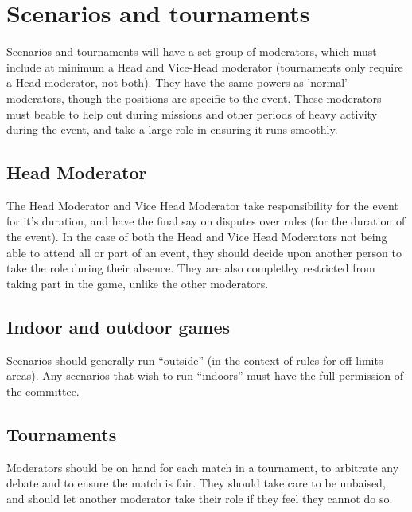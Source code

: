 \documentclass{article}
\begin{document}
\section{Scenarios and tournaments}

	Scenarios and tournaments will have a set group of moderators, which must include at minimum a Head and Vice-Head moderator (tournaments only require a Head moderator, not both). They have the same powers as 'normal' moderators, though the positions are specific to the event. These moderators must beable to help out during missions and other periods of heavy activity during the event, and take a large role in ensuring it runs smoothly.
	
	\subsection{Head Moderator}
		The Head Moderator and Vice Head Moderator take responsibility for the event for it's duration, and have the final say on disputes over rules (for the duration of the event). In the case of both the Head and Vice Head Moderators not being able to attend all or part of an event, they should decide upon another person to take the role during their absence. They are also completley restricted from taking part in the game, unlike the other moderators.

	\subsection{Indoor and outdoor games}
		Scenarios should generally run ``outside'' (in the context of rules for off-limits areas). Any scenarios that wish to run ``indoors'' must have the full permission of the committee.
	
	\subsection{Tournaments}
		Moderators should be on hand for each match in a tournament, to arbitrate any debate and to ensure the match is fair. They should take care to be unbaised, and should let another moderator take their role if they feel they cannot do so.
\end{document}

